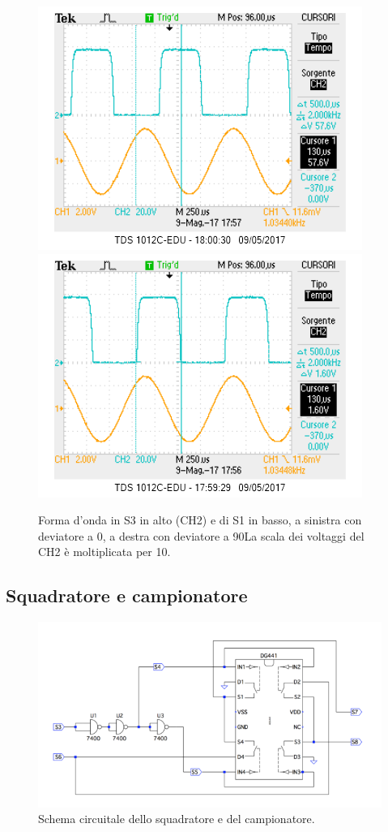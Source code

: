 \documentclass[10pt,a4paper]{article}
\begin{document}
\begin{figure}[!htb]
  \includegraphics[scale=0.75]{deviatore0.png}\includegraphics[scale=0.75]{deviatore90.png}
\caption{Forma d'onda in S3 in alto (CH2) e di S1 in basso, a sinistra con deviatore a 0\degree, a destra con deviatore a 90\degree La scala dei voltaggi del CH2 è moltiplicata per 10.\label{osc:dev}}
\end{figure}

\subsection{Squadratore e campionatore}

\begin{figure}[!htb]
  \centering
  \includegraphics[scale=0.75]{sqadratore-campionatore.png}
\caption{Schema circuitale dello squadratore e del campionatore.\label{fig:sqadratore-campionatore}}
\end{figure}
\end{document}
